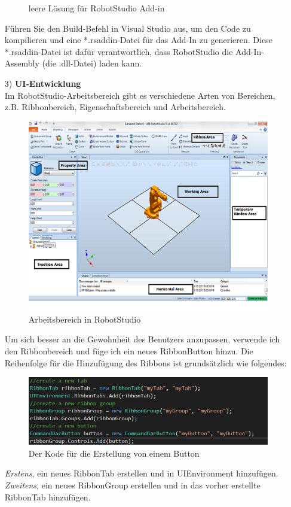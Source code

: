 \documentclass[14pt,a4paper,titlepage]{article}
\begin{document}
\begin{itemize}
\begin{figure}[h!]
					\caption{leere Lösung für RobotStudio Add-in}
					\end{figure}
				\bigbreak
				Führen Sie den Build-Befehl in Visual Studio aus, um den Code zu kompilieren und eine *.rsaddin-Datei für das Add-In zu generieren. Diese *.rsaddin-Datei ist dafür verantwortlich, dass RobotStudio die Add-In-Assembly (die .dll-Datei) laden kann.
				\item[3)]
				\textbf{UI-Entwicklung}
				\\
				Im RobotStudio-Arbeitsbereich gibt es verschiedene Arten von Bereichen, z.B. Ribbonbereich, Eigenschaftsbereich und Arbeitsbereich.\bigbreak
					\begin{figure}[h!]
						\centering
						\includegraphics[width=0.6\linewidth]{workarea.png}
						\caption{Arbeitsbereich in RobotStudio}
					\end{figure}
				Um sich besser an die Gewohnheit des Benutzers anzupassen, verwende ich den Ribbonbereich und füge ich ein neues RibbonButton hinzu. 
				Die Reihenfolge für die Hinzufügung des Ribbons ist grundsätzlich wie folgendes:\\
					\begin{figure}[h!]
						\centering
						\includegraphics[width=0.8\linewidth]{createbutton.png}
						\caption{Der Kode für die Erstellung von einem Button}
					\end{figure}
				\pagebreak
				\emph{Erstens}, ein neues RibbonTab erstellen und in UIEnvironment hinzufügen.\\
				\emph{Zweitens},
				 ein neues RibbonGroup erstellen und in das vorher erstellte RibbonTab hinzufügen.\\

\end{itemize}
\end{document}

